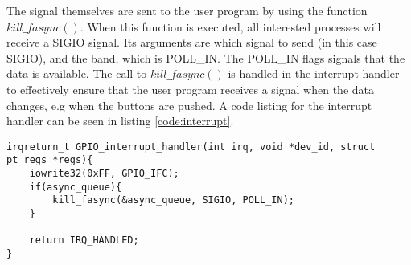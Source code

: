 The signal themselves are sent to the user program by using the function $kill\_fasync()$. When this function is executed, all interested processes will receive a SIGIO signal. Its arguments are which signal to send (in this case SIGIO), and the band, which is POLL\_IN. The POLL\_IN flags signals that the data is available. The call to $kill\_fasync()$ is handled in the interrupt handler to effectively ensure that the user program receives a signal when the data changes, e.g when the buttons are pushed. A code listing for the interrupt handler can be seen in listing \ref{code:interrupt}.


\begin{lstlisting}[caption=Interrupt handler, label=code:interrupt]
irqreturn_t GPIO_interrupt_handler(int irq, void *dev_id, struct pt_regs *regs){
    iowrite32(0xFF, GPIO_IFC);
    if(async_queue){
        kill_fasync(&async_queue, SIGIO, POLL_IN);
    }
    
    return IRQ_HANDLED;
}
\end{lstlisting}